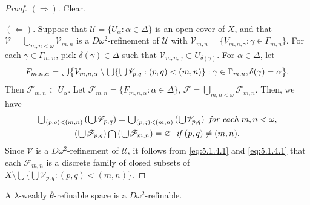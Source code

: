 \documentclass[main.tex]{subfiles}
\begin{document}
\begin{proof}
$(\Rightarrow)$. Clear.

$(\Leftarrow)$. Suppose that $\mathscr{U} =\{ U_\alpha: \alpha\in\Delta\}$ is an open cover 
of $X$, 
and that $\mathscr{V} = \bigcup_{m,n<\omega} \mathscr{V}_{m,n}$ 
is a $D\omega^2$-refinement of $\mathscr{U}$ with 
$\mathscr{V}_{m,n} = \{V_{m,n,\gamma}: \gamma \in \Gamma_{m,n}\}$. 
For each $\gamma\in \Gamma_{m,n}$, pick $\delta(\gamma) \in \Delta$ 
such that $\mathscr{V}_{m,n,\gamma} \subset U_{\delta(\gamma)}$. 
For $\alpha\in\Delta$, let 
\begin{gather*}
F_{m,n,\alpha} = \raisebox{-2pt}{\scalebox{1.5}{$\cup$}}\big\{ V_{m,n,\alpha} \setminus 
  \raisebox{-2pt}{\scalebox{1.5}{$\cup$}}  \{\raisebox{-2pt}{\scalebox{1.5}{$\cup$}}\mathscr{V}_{p,q}: (p,q)<(m,n)\} 
  	: \gamma \in \Gamma_{m,n}, \delta(\gamma) = \alpha
	\big\}. 
\end{gather*}
Then $\mathscr{F}_{m,n}\subset U_\alpha$.
Let $\mathscr{F}_{m,n} = \{F_{m,n,\alpha}:  \alpha \in \Delta\}$,
$\mathscr{F} = \bigcup_{m,n<\omega} \mathscr{F}_{m,n}$.
Then, we have
\begin{gather}
\raisebox{-2pt}{\scalebox{1.5}{$\cup$}}_{(p,q)<(m,n)} \left(\raisebox{-2pt}{\scalebox{1.5}{$\cup$}}\mathscr{F}_{p,q}\right) = 
    \raisebox{-2pt}{\scalebox{1.5}{$\cup$}}_{(p,q)<(m,n)} \left(\raisebox{-2pt}{\scalebox{1.5}{$\cup$}}\mathscr{V}_{p,q}\right) 
    \textit{ for each } m, n < \omega, \label{eq:5.1.4.1} \\
 \left(\raisebox{-2pt}{\scalebox{1.5}{$\cup$}}\mathscr{F}_{p,q}\right) 
  \raisebox{-2pt}{\scalebox{1.5}{$\cap$}}
  \left(\raisebox{-2pt}{\scalebox{1.5}{$\cup$}}\mathscr{F}_{m,n}\right) = \varnothing
   \; \textit{ if } (p,q) \ne (m,n).  \label{eq:5.1.4.2} 
\end{gather}
Since $\mathscr{V}$ is a $D\omega^2$-refinement of $\mathscr{U}$,
it follows from \eqref{eq:5.1.4.1} and \eqref{eq:5.1.4.1} that each $\mathscr{F}_{m,n}$ 
is a discrete family of closed subsets of $X \setminus \bigcup\{\bigcup \mathscr{V}_{p,q}: (p,q) < (m,n)\}$.
\end{proof}

{\theorem{} \label{th:5.1.5}
A $\lambda$-weakly $\overline{\theta}$-refinable space is a $D\omega^2$-refinable.
}
\end{document}
